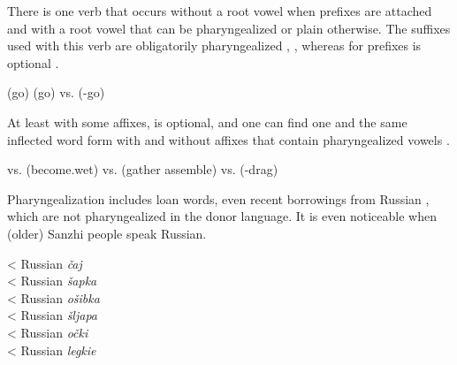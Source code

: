 There is one verb  that occurs without a root vowel when prefixes are attached and with a root vowel that can be pharyngealized or plain otherwise. The suffixes used with this verb are obligatorily pharyngealized , , whereas for prefixes  is optional .
%
\begin{exe}
	\ex	\label{ex:go pharyngealization phon}
	\begin{xlist}
		\ex	{}  (go) \label{ex:go pharyngealization phonA}
		\ex	{}  (go) \label{ex:go pharyngealization phonB}
		\ex	{} vs.   (-go) \label{ex:go pharyngealization phonC}
	\end{xlist}
\end{exe}

At least with some affixes,  is optional, and one can find one and the same inflected word form with and without affixes that contain pharyngealized vowels .
%
\begin{exe}
	\ex	\label{ex:optional pharyngealization phon}
	\begin{xlist}
	\TabPositions{13em}
		\ex	{} vs.  		\tab {} (become.wet\tsc{.pfv-dd.sg})
		\ex	{} vs. 	\tab {} (gather assemble\tsc{-subj})
		\ex	{} vs.  		\tab {} (-drag\tsc{.pfv-imp.pl})
	\end{xlist}
\end{exe}




Pharyngealization includes loan words, even recent borrowings from Russian , which are not pharyngealized in the donor language. It is even noticeable when (older) Sanzhi people speak Russian.
%
\begin{exe}
	\ex	\label{ex:loan pharyngealization phon}
	\TabPositions{12em}
		 	\tab 	< Russian \textit{čaj}	 \\
		 	\tab 	< Russian 	\textit{šapka} \\
		 	\tab 	< Russian \textit{ošibka}	 \\	
		  \tab 	< Russian	\textit{šljapa} \\
		  \tab 	< Russian	\textit{očki} \\
		  \tab 	< Russian	\textit{legkie} 
\end{exe}


